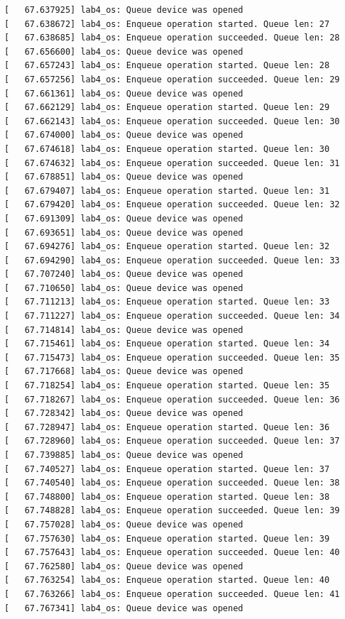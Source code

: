\documentclass[a4paper,14pt]{extarticle}
\begin{document}
\begin{verbatim}
[   67.637925] lab4_os: Queue device was opened
[   67.638672] lab4_os: Enqueue operation started. Queue len: 27
[   67.638685] lab4_os: Enqueue operation succeeded. Queue len: 28
[   67.656600] lab4_os: Queue device was opened
[   67.657243] lab4_os: Enqueue operation started. Queue len: 28
[   67.657256] lab4_os: Enqueue operation succeeded. Queue len: 29
[   67.661361] lab4_os: Queue device was opened
[   67.662129] lab4_os: Enqueue operation started. Queue len: 29
[   67.662143] lab4_os: Enqueue operation succeeded. Queue len: 30
[   67.674000] lab4_os: Queue device was opened
[   67.674618] lab4_os: Enqueue operation started. Queue len: 30
[   67.674632] lab4_os: Enqueue operation succeeded. Queue len: 31
[   67.678851] lab4_os: Queue device was opened
[   67.679407] lab4_os: Enqueue operation started. Queue len: 31
[   67.679420] lab4_os: Enqueue operation succeeded. Queue len: 32
[   67.691309] lab4_os: Queue device was opened
[   67.693651] lab4_os: Queue device was opened
[   67.694276] lab4_os: Enqueue operation started. Queue len: 32
[   67.694290] lab4_os: Enqueue operation succeeded. Queue len: 33
[   67.707240] lab4_os: Queue device was opened
[   67.710650] lab4_os: Queue device was opened
[   67.711213] lab4_os: Enqueue operation started. Queue len: 33
[   67.711227] lab4_os: Enqueue operation succeeded. Queue len: 34
[   67.714814] lab4_os: Queue device was opened
[   67.715461] lab4_os: Enqueue operation started. Queue len: 34
[   67.715473] lab4_os: Enqueue operation succeeded. Queue len: 35
[   67.717668] lab4_os: Queue device was opened
[   67.718254] lab4_os: Enqueue operation started. Queue len: 35
[   67.718267] lab4_os: Enqueue operation succeeded. Queue len: 36
[   67.728342] lab4_os: Queue device was opened
[   67.728947] lab4_os: Enqueue operation started. Queue len: 36
[   67.728960] lab4_os: Enqueue operation succeeded. Queue len: 37
[   67.739885] lab4_os: Queue device was opened
[   67.740527] lab4_os: Enqueue operation started. Queue len: 37
[   67.740540] lab4_os: Enqueue operation succeeded. Queue len: 38
[   67.748800] lab4_os: Enqueue operation started. Queue len: 38
[   67.748828] lab4_os: Enqueue operation succeeded. Queue len: 39
[   67.757028] lab4_os: Queue device was opened
[   67.757630] lab4_os: Enqueue operation started. Queue len: 39
[   67.757643] lab4_os: Enqueue operation succeeded. Queue len: 40
[   67.762580] lab4_os: Queue device was opened
[   67.763254] lab4_os: Enqueue operation started. Queue len: 40
[   67.763266] lab4_os: Enqueue operation succeeded. Queue len: 41
[   67.767341] lab4_os: Queue device was opened

\end{verbatim}
\end{document}
